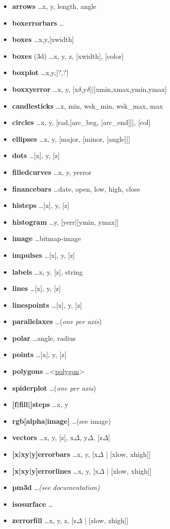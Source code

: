{\footnotesize
\begin{itemize}
    \item \textbf{arrows} \dots x, y, length, angle
    \item \textbf{boxerrorbars} \dots 
    \item \textbf{boxes} \dots x,y,[xwidth]
    \item \textbf{boxes} (3d) \dots x, y, z, [xwidth], [color]
    \item \textbf{boxplot} \dots x,y,[?,?]
    \item \textbf{boxxyerror} \dots x, y, [x$\delta$,y$\delta$]|[xmin,xmax,ymin,ymax]
    \item \textbf{candlesticks} \dots x, min, wsk\_min, wsk\_max, max
    \item \textbf{circles} \dots x, y, [rad,[arc\_beg, [arc\_end]]], [col]
    \item \textbf{ellipses} \dots x, y, [major, [minor, [angle]]]
    \item \textbf{dots} \dots [x], y, [z]
    \item \textbf{filledcurves} \dots x, y, yerror
    \item \textbf{financebars} \dots date, open, low, high, close
    \item \textbf{histeps} \dots [x], y, [z]
    \item \textbf{histogram} \dots y, [yerr|[ymin, ymax]] 
    \item \textbf{image} \dots bitmap-image 
    \item \textbf{impulses} \dots [x], y, [z] 
    \item \textbf{labels} \dots x, y, [z], string 
    \item \textbf{lines} \dots [x], y, [z]
    \item \textbf{linespoints} \dots [x], y, [z]
    \item \textbf{parallelaxes} \dots (\textit{one per axis}) 
    \item \textbf{polar}  \dots angle, radius 
    \item \textbf{points} \dots [x], y, [z]
    \item \textbf{polygons} \dots <\href{http://gnuplot.sourceforge.net/demo\_5.5/polygons.html}{polygon}>
    \item \textbf{spiderplot} \dots (\textit{one per axis}) 
    \item \textbf{{[f|fill|]}steps} \dots x, y
    \item \textbf{rgb[alpha|image]} \dots (see image)
    \item \textbf{vectors} \dots x, y, [z], x$\Delta$, y$\Delta$, [z$\Delta$] 
    \item \textbf{{[x|xy|y]}errorbars} \dots x, y, [x$\Delta$ | [xlow, xhigh]] 
    \item \textbf{{[x|xy|y]}errorlines} \dots x, y, [x$\Delta$ | [xlow, xhigh]] 
    \item \textbf{pm3d} \dots \textit{(see documentation)}
    \item \textbf{isosurface} \dots <voxel-grid-file>
    \item \textbf{zerrorfill} \dots x, y, z, [z$\Delta$ | [zlow, zhigh]] 
\end{itemize}}

